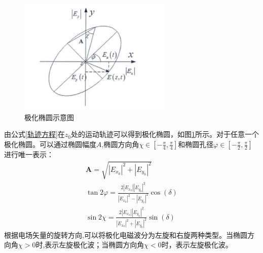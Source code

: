 \documentclass[promaster]{thesis-uestc}
\begin{document}
\begin{figure}[h]
    \includegraphics[width=7.3cm]{pic/chapter2/极化椭圆.jpg}
    \caption{极化椭圆示意图}
    \label{极化椭圆示意图}
\end{figure}

由公式\ref{轨迹方程}在$z_0$处的运动轨迹可以得到极化椭圆，如图\ref{极化椭圆示意图}所示。对于任意一个极化椭圆。可以通过椭圆幅度$A$,椭圆方向角$\chi \in [-\frac{\pi}{4}, \frac{\pi}{4}]$和椭圆孔径$\varphi \in [-\frac{\pi}{2}, \frac{\pi}{2}]$进行唯一表示：
\begin{gather}
    \mathbf{A}=\sqrt{\left|E_{x_0}\right|^2+\left|E_{y_0}\right|^2}                                                                \\
    \tan 2 \varphi=\frac{2\left|E_{x_0}\right|\left|E_{y_0}\right|^2}{\left|E_{x_0}\right|^2-\left|E_{y_0}\right|^2} \cos (\delta) \\
    \sin 2 \chi=\frac{2\left|E_{x_0}\right|\left|E_{y_0}\right|^2}{\left|E_{x_0}\right|^2+\left|E_{y_0}\right|^2} \sin (\delta)
\end{gather}
根据电场矢量的旋转方向,可以将极化电磁波分为左旋和右旋两种类型。当椭圆方向角$\chi > 0$时,表示左旋极化波；当椭圆方向角$\chi < 0$时，表示左旋极化波。
\end{document}
